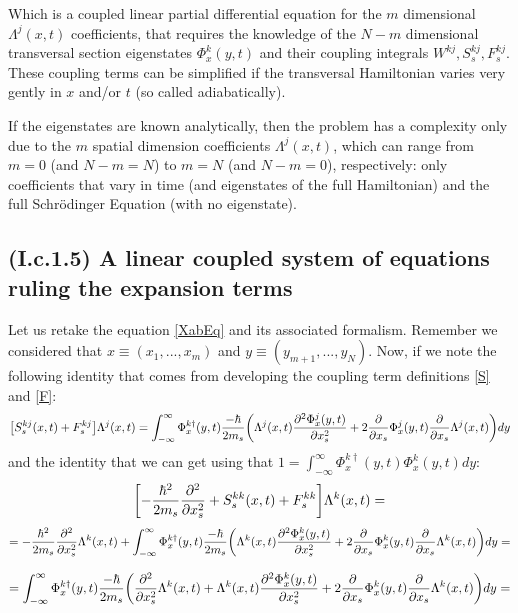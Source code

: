 \documentclass[11pt, a4paper]{article} %
\begin{document}
Which is a coupled linear partial differential equation for the $m$ dimensional $\Lambda^j(x,t)$ coefficients, that requires the knowledge of the $N-m$ dimensional transversal section eigenstates $\Phi^k_x(y,t)$ and their coupling integrals $W^{kj}, S^{kj}_s, F^{kj}_s$. These coupling terms can be simplified if the transversal Hamiltonian varies very gently in $x$ and/or $t$ (so called adiabatically).

If the eigenstates are known analytically, then the problem has a complexity only due to the $m$ spatial dimension coefficients $\Lambda^j(x,t)$, which can range from $m=0$ (and $N-m=N$) to $m=N$ (and $N-m=0$), respectively: only coefficients that vary in time (and eigenstates of the full Hamiltonian) and the full Schrödinger Equation (with no eigenstate).

\subsection*{(I.c.1.5) A linear coupled system of equations ruling the expansion terms}

Let us retake the equation \eqref{XabEq} and its associated formalism. Remember we considered that $x\equiv (x_1,...,x_m)$ and $y\equiv (y_{m+1},...,y_N)$. Now, if we note the following identity that comes from developing the coupling term definitions \eqref{S} and \eqref{F}:
\begin{equation}
\qty[S^{kj}_s(x,t)+F_s^{kj}]\Lambda^j(x,t)=\int_{-\infty}^\infty \Phi^{k\dagger}_x(y,t) \frac{-\hbar}{2m_s}\qty( \Lambda^j(x,t)\pdv[2]{\Phi^j_x(y,t)}{x_s}+2\pdv{}{x_s}\Phi^j_x(y,t)\pdv{}{x_s}\Lambda^j(x,t) ) dy
\end{equation}
and the identity that we can get using that $1=\int_{-\infty}^\infty \Phi^{k\dagger}_x(y,t) \Phi^k_x(y,t)dy$:
\begin{equation}
\qty[-\frac{\hbar^2}{2m_s}\pdv[2]{}{x_s}+S^{kk}_s(x,t)+F_s^{kk}]\Lambda^k(x,t)=
\end{equation}
$$
=-\frac{\hbar^2}{2m_s}\pdv[2]{}{x_s}\Lambda^k(x,t)+\int_{-\infty}^\infty \Phi^{k\dagger}_x(y,t) \frac{-\hbar}{2m_s}\qty( \Lambda^k(x,t)\pdv[2]{\Phi^k_x(y,t)}{x_s}+2\pdv{}{x_s}\Phi^k_x(y,t)\pdv{}{x_s}\Lambda^k(x,t) ) dy=
$$

$$
=\int_{-\infty}^\infty \Phi^{k\dagger}_x(y,t) \frac{-\hbar}{2m_s}\qty(\pdv[2]{}{x_s}\Lambda^k(x,t)+ \Lambda^k(x,t)\pdv[2]{\Phi^k_x(y,t)}{x_s}+2\pdv{}{x_s}\Phi^k_x(y,t)\pdv{}{x_s}\Lambda^k(x,t) ) dy=
$$
\end{document}
